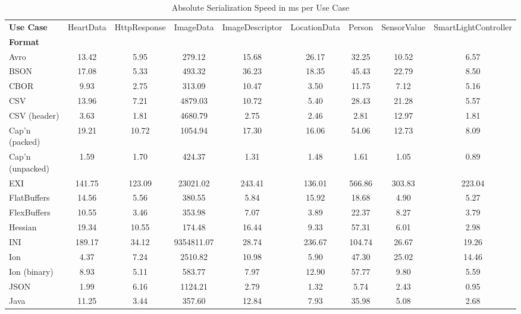 \documentclass[10pt]{IEEEtran}
\begin{document}
\setlength{\tabcolsep}{0.4em} %
{\renewcommand{\arraystretch}{1.5}%
\begin{table*}[t]
    \centering
    \caption{Absolute Serialization Speed in ms per Use Case}
    \label{tab:speed}
    \begin{tabular}{|p{21mm}|c|c|c|c|c|c|c|c|}
    \hline
    \textbf{Use Case} & HeartData & HttpResponse & ImageData & ImageDescriptor & LocationData & Person & SensorValue & SmartLightController \\
    \textbf{Format} &  &  &  &  &  &  &  &  \\
    \hline
    Avro & 13.42 & 5.95 & 279.12 & 15.68 & 26.17 & 32.25 & 10.52 & 6.57 \\ \hline
    BSON & 17.08 & 5.33 & 493.32 & 36.23 & 18.35 & 45.43 & 22.79 & 8.50 \\ \hline
    CBOR & 9.93 & 2.75 & 313.09 & 10.47 & 3.50 & 11.75 & 7.12 & 5.16 \\ \hline
    CSV & 13.96 & 7.21 & 4879.03 & 10.72 & 5.40 & 28.43 & 21.28 & 5.57 \\ \hline
    CSV (header) & 3.63 & 1.81 & 4680.79 & 2.75 & 2.46 & 2.81 & 12.97 & 1.81 \\ \hline
    Cap'n (packed) & 19.21 & 10.72 & 1054.94 & 17.30 & 16.06 & 54.06 & 12.73 & 8.09 \\ \hline
    Cap'n (unpacked) & 1.59 & 1.70 & 424.37 & 1.31 & 1.48 & 1.61 & 1.05 & 0.89 \\ \hline
    EXI & 141.75 & 123.09 & 23021.02 & 243.41 & 136.01 & 566.86 & 303.83 & 223.04 \\ \hline
    FlatBuffers & 14.56 & 5.56 & 380.55 & 5.84 & 15.92 & 18.68 & 4.90 & 5.27 \\ \hline
    FlexBuffers & 10.55 & 3.46 & 353.98 & 7.07 & 3.89 & 22.37 & 8.27 & 3.79 \\ \hline
    Hessian & 19.34 & 10.55 & 174.48 & 16.44 & 9.33 & 57.31 & 6.01 & 2.98 \\ \hline
    INI & 189.17 & 34.12 & 9354811.07 & 28.74 & 236.67 & 104.74 & 26.67 & 19.26 \\ \hline
    Ion & 4.37 & 7.24 & 2510.82 & 10.98 & 5.90 & 47.30 & 25.02 & 14.46 \\ \hline
    Ion (binary) & 8.93 & 5.11 & 583.77 & 7.97 & 12.90 & 57.77 & 9.80 & 5.59 \\ \hline
    JSON & 1.99 & 6.16 & 1124.21 & 2.79 & 1.32 & 5.74 & 2.43 & 0.95 \\ \hline
    Java & 11.25 & 3.44 & 357.60 & 12.84 & 7.93 & 35.98 & 5.08 & 2.68 \\ \hline

\end{tabular}
\end{table*}}
\end{document}
